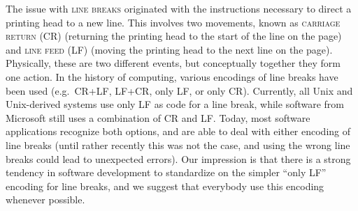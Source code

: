 The issue with \textsc{line breaks} originated with the instructions necessary to direct a printing head to a new line. This involves two movements, known as \textsc{carriage return (CR)} (returning the printing head to the start of the line on the page) and \textsc{line feed (LF)} (moving the printing head to the next line on the page). Physically, these are two different events, but conceptually together they form one action. In the history of computing, various encodings of line breaks have been used (e.g.~CR+LF, LF+CR, only LF, or only CR). Currently, all Unix and Unix-derived systems use only LF as code for a line break, while software from Microsoft still uses a combination of CR and LF. Today, most software applications recognize both options, and are able to deal with either encoding of line breaks (until rather recently this was not the case, and using the wrong line breaks could lead to unexpected errors). Our impression is that there is a strong tendency in software development to standardize on the simpler ``only LF'' encoding for line breaks, and we suggest that everybody use this encoding whenever possible.

